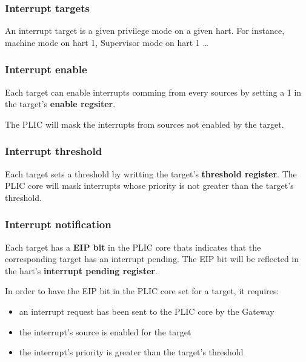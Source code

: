 \documentclass[10pt, a4paper]{article}
\begin{document}
\subsubsection{Interrupt targets}

An interrupt target is a given privilege mode on a given hart.
For instance, machine mode on hart 1, Supervisor mode on hart 1 \dots{}


\subsubsection{Interrupt enable}

Each target can enable interrupts comming from every sources by setting a 1 in the target's \textbf{enable regsiter}.

The PLIC will mask the interrupts from sources not enabled by the target.\\

\noindent {}


\subsubsection{Interrupt threshold}

Each target sets a threshold by writting the target's \textbf{threshold register}.
The PLIC core will mask interrupts whose priority is not greater than the target's threshold.\\

\noindent {}


\subsubsection{Interrupt notification}

Each target has a \textbf{EIP bit} in the PLIC core thats indicates that the corresponding target has an interrupt pending. The EIP bit will be reflected in the hart's \textbf{interrupt pending register}.

In order to have the EIP bit in the PLIC core set for a target, it requires:

\begin{itemize}
	\item  an interrupt request has been sent to the PLIC core by the Gateway
	\item the interrupt's source is enabled for the target
	\item the interrupt's priority is greater than the target's threshold
\end{itemize}
\end{document}
